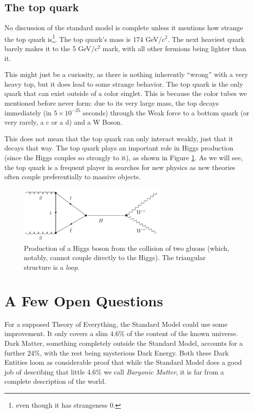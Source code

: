 \subsection{The top quark}
No discussion of the standard model is complete unless it mentions how strange the top quark is\footnote{even though it has strangeness 0.}. The top quark's mass is 174 GeV/c$^2$. The next heaviest quark barely makes it to the 5 GeV/c$^2$ mark, with all other fermions being lighter than it. 

This might just be a curiosity, as there is nothing inherently ``wrong'' with a very heavy top, but it does lead to some strange behavior. The top quark is the only quark that can exist outside of a color singlet. This is because the color tubes we mentioned before never form: due to its very large mass, the top decays immediately (in $5\times 10^{-25}$ seconds) through the Weak force to a bottom quark (or very rarely, a c or a d) and a W Boson. 

This does not mean that the top quark can only interact weakly, just that it decays that way. The top quark plays an important role in Higgs production (since the Higgs couples so strongly to it), as shown in Figure \ref{Fig:Intro:TopDecayHiggs}. As we will see, the top quark is a frequent player in searches for new physics as new theories often couple preferentially to massive objects.
\begin{figure}[h]
    \centering
        \includegraphics[width=0.66\textwidth]{F1/higgsProd}
        \caption{Production of a Higgs boson from the collision of two gluons (which, notably, cannot couple directly to the Higgs). The triangular structure is a \textit{loop}.}
        \label{Fig:Intro:TopDecayHiggs}
\end{figure}
\section{A Few Open Questions}
For a supposed Theory of Everything, the Standard Model could use some improvement. It only covers a slim $4.6\%$ of the content of the known universe. Dark Matter, something completely outside the Standard Model, accounts for a further $24\%$, with the rest being mysterious Dark Energy. Both these Dark Entities loom as considerable proof that while the Standard Model does a good job of describing that little $4.6\%$ we call \textit{Baryonic Matter}, it is far from a complete description of the world.

